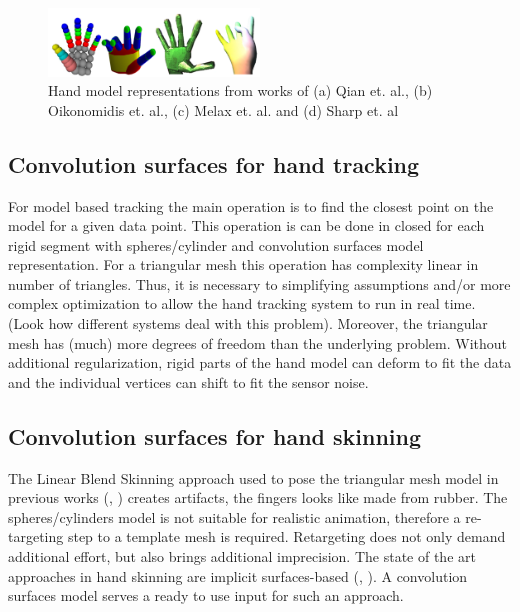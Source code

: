 \begin{figure}[h!] 
	\centering
	\hspace{-2em}
	\includegraphics[width=0.5\textwidth]{fig/hand_model_representations}
	\caption {Hand model representations from works of (a) Qian et. al., (b)  Oikonomidis et. al., (c) Melax et. al.  and (d) Sharp et. al}
	\label{fig:hand_model_representations}
\end{figure}

\subsection{Convolution surfaces for hand tracking}
For model based tracking the main operation is to find the closest point on the model for a given data point. This operation is can be done in closed for each rigid segment with spheres/cylinder and convolution surfaces model representation. 
For a triangular mesh this operation has complexity linear in number of triangles. Thus, it is necessary to simplifying assumptions and/or more complex optimization to allow the hand tracking system to run in real time. (Look how different systems deal with this problem). Moreover, the triangular mesh has (much) more degrees of freedom than the underlying problem. Without additional regularization, rigid parts of the hand model can deform to fit the data and the individual vertices can shift to fit the sensor noise.

\subsection{Convolution surfaces for hand skinning}
The Linear Blend Skinning approach used to pose the triangular mesh model in previous works (\cite{sharp2015accurate}, \cite{schroder2013analysis} ) creates artifacts, the fingers looks like made from rubber. The spheres/cylinders model is not suitable for realistic animation, therefore a re-targeting step to a template mesh is required. Retargeting does not only demand additional effort, but also brings additional imprecision. The state of the art approaches in hand skinning are implicit surfaces-based (\cite{vaillant2013implicit},  \cite{vaillant2014robust} ).  A convolution surfaces model serves a ready to use input for such an approach.








